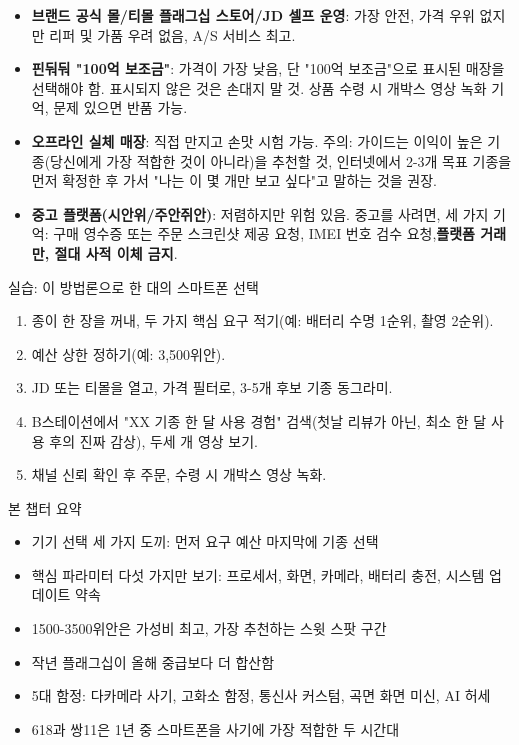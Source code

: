 
\begin{itemize}
  \item \textbf{브랜드 공식 몰/티몰 플래그십 스토어/JD 셀프 운영}: 가장 안전, 가격 우위 없지만 리퍼 및 가품 우려 없음, A/S 서비스 최고.
  \item \textbf{핀둬둬 "100억 보조금"}: 가격이 가장 낮음, 단 "100억 보조금"으로 표시된 매장을 선택해야 함. 표시되지 않은 것은 손대지 말 것. 상품 수령 시 개박스 영상 녹화 기억, 문제 있으면 반품 가능.
  \item \textbf{오프라인 실체 매장}: 직접 만지고 손맛 시험 가능. 주의: 가이드는 이익이 높은 기종(당신에게 가장 적합한 것이 아니라)을 추천할 것, 인터넷에서 2-3개 목표 기종을 먼저 확정한 후 가서 "나는 이 몇 개만 보고 싶다"고 말하는 것을 권장.
  \item \textbf{중고 플랫폼(시안위/주안쥐안)}: 저렴하지만 위험 있음. 중고를 사려면, 세 가지 기억: 구매 영수증 또는 주문 스크린샷 제공 요청, IMEI 번호 검수 요청,\textbf{플랫폼 거래만, 절대 사적 이체 금지}.
\end{itemize}

\begin{tcbpractice}{실습: 이 방법론으로 한 대의 스마트폰 선택}
\begin{enumerate}
  \item 종이 한 장을 꺼내, 두 가지 핵심 요구 적기(예: 배터리 수명 1순위, 촬영 2순위).
  \item 예산 상한 정하기(예: 3,500위안).
  \item JD 또는 티몰을 열고, 가격 필터로, 3-5개 후보 기종 동그라미.
  \item B스테이션에서 "XX 기종 한 달 사용 경험" 검색(첫날 리뷰가 아닌, 최소 한 달 사용 후의 진짜 감상), 두세 개 영상 보기.
  \item 채널 신뢰 확인 후 주문, 수령 시 개박스 영상 녹화.
\end{enumerate}

\end{tcbpractice}

\begin{tcbsummary}{본 챕터 요약}
\begin{itemize}
  \item 기기 선택 세 가지 도끼: 먼저 요구 예산 마지막에 기종 선택
  \item 핵심 파라미터 다섯 가지만 보기: 프로세서, 화면, 카메라, 배터리 충전, 시스템 업데이트 약속
  \item 1500-3500위안은 가성비 최고, 가장 추천하는 스윗 스팟 구간
  \item 작년 플래그십이 올해 중급보다 더 합산함
  \item 5대 함정: 다카메라 사기, 고화소 함정, 통신사 커스텀, 곡면 화면 미신, AI 허세
  \item 618과 쌍11은 1년 중 스마트폰을 사기에 가장 적합한 두 시간대
\end{itemize}

\end{tcbsummary}
